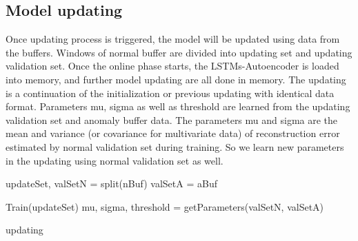 \subsection{Model updating}
\label{updating}

Once updating process is triggered, the model will be updated using data from the buffers. Windows of normal buffer are divided into updating set and updating validation set. Once the online phase starts, the LSTMs-Autoencoder is loaded into memory, and further model updating are all done in memory. The updating is a continuation of the initialization or previous updating with identical data format. Parameters mu, sigma as well as threshold are learned from the updating validation set and anomaly buffer data. The parameters mu and sigma are the mean and variance (or covariance for multivariate data) of reconstruction error estimated by normal validation set during training. So we learn new parameters in the updating using normal validation set as well.

\begin{algorithm}[h]

\BlankLine 
updateSet, valSetN = split(nBuf)\;
valSetA = aBuf\;

Train(updateSet)\;
mu, sigma, threshold = getParameters(valSetN, valSetA)

\caption{updating}
\label{alg:update}
\end{algorithm}




